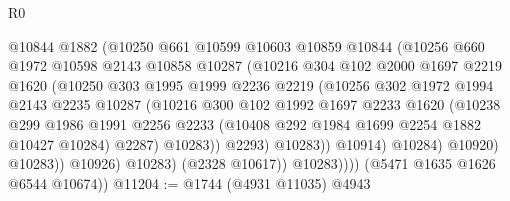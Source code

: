 \begin{lexlean}{R0}
\begin{coremodule}
                            @10844
                            @1882
                            (@10250
                              @661
                              @10599
                              @10603
                              @10859
                              @10844
                              (@10256
                                @660
                                @1972
                                @10598
                                @2143
                                @10858
                                @10287
                                (@10216
                                  @304
                                  @102
                                  @2000
                                  @1697
                                  @2219
                                  @1620
                                  (@10250
                                    @303
                                    @1995
                                    @1999
                                    @2236
                                    @2219
                                    (@10256
                                      @302
                                      @1972
                                      @1994
                                      @2143
                                      @2235
                                      @10287
                                      (@10216
                                        @300
                                        @102
                                        @1992
                                        @1697
                                        @2233
                                        @1620
                                        (@10238
                                          @299
                                          @1986
                                          @1991
                                          @2256
                                          @2233
                                          (@10408 @292 @1984 @1699 @2254 @1882 @10427 @10284)
                                          @2287)
                                        @10283))
                                    @2293)
                                  @10283))
                              @10914)
                            @10284)
                          @10920)
                        @10283))
                    @10926)
                  @10283)
                (@2328 @10617))
              @10283))))
      (@5471 @1635 @1626 @6544 @10674))
@11204 := @1744 (@4931 @11035) @4943

\end{coremodule}
\end{lexlean}
